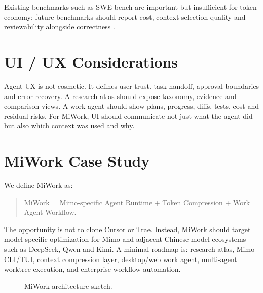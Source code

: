 \documentclass[11pt]{article}
\begin{document}
Existing benchmarks such as SWE-bench are important but insufficient for token economy; future benchmarks should report cost, context selection quality and reviewability alongside correctness \cite{swebench,webbench,swe_skills_bench,webarena,gaia,humaneval}.

\section{UI / UX Considerations}
Agent UX is not cosmetic. It defines user trust, task handoff, approval boundaries and error recovery. A research atlas should expose taxonomy, evidence and comparison views. A work agent should show plans, progress, diffs, tests, cost and residual risks. For MiWork, UI should communicate not just what the agent did but also which context was used and why.

\section{MiWork Case Study}
We define MiWork as:
\begin{quote}
MiWork = Mimo-specific Agent Runtime + Token Compression + Work Agent Workflow.
\end{quote}
The opportunity is not to clone Cursor or Trae. Instead, MiWork should target model-specific optimization for Mimo and adjacent Chinese model ecosystems such as DeepSeek, Qwen and Kimi. A minimal roadmap is: research atlas, Mimo CLI/TUI, context compression layer, desktop/web work agent, multi-agent worktree execution, and enterprise workflow automation.

\begin{figure}[h]
\centering
{}
\caption{MiWork architecture sketch.}
\label{fig:miwork}
\end{figure}
\end{document}
